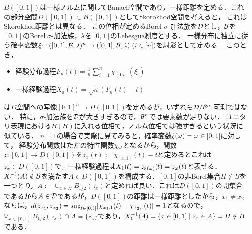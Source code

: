 \documentclass[uplatex,dvipdfmx]{jsreport}
\begin{document}
\begin{example}\label{exp-non-measurable-process}
    $B([0,1])$は一様ノルムに関してBanach空間であり，一様距離を定める．これの部分空間$D([0,1])\subset B([0,1])$としてSkorokhod空間を考えると，
    これはSkorokhod距離とは異なる．
    この位相が定めるBorel $\sigma$-加法族を$\mathcal{D}$とし，$\mathcal{B}$を$[0,1]$のBorel $\sigma$-加法族，$\lambda$を$[0,1]$のLebesgue測度とする．
    一様分布に独立に従う確率変数$\xi_i:([0,1],\mathcal{B},\lambda)^n\to([0,1],\mathcal{B},\lambda)\;(i\in[n])$を射影として定める．
    このとき，
    \begin{itemize}
        \item 経験分布過程$F_n(t)=\frac{1}{n}\sum_{i=1}^n\chi_{[0,t]}(\xi_i)$
        \item 一様経験過程$X_n(t)=\sqrt{n}(F_n(t)-t)$
    \end{itemize}
    は$D$空間への写像$[0,1]^n\to D([0,1])$を定めるが，いずれも$\mathcal{D}/\mathcal{B}^n$-可測ではない．
    特に，$\sigma$-加法族を$\mathcal{D}$が大きすぎるので，$\mathcal{B}^n$では要素数が足りない．
    ユニタリ表現における$B(H)$に入れる位相で，ノルム位相では強すぎるという状況に似ている．
    $n=1$の場合で実際に見てみると，確率変数$\xi(\omega)=\omega\in[0,1]$に対して，
    経験分布関数はただの特性関数$\chi_{\omega}$となるから，関数$z:[0,1]\to D([0,1])$を$z_x(t):=\chi_{[x,1]}(t)-t$と定めるとこれは$z_x\in D([0,1])$で，一様経験過程は$X_1(t)=z_{\xi(\omega)}(t)=z_\omega(t)$と表せる．
    $X_1^{-1}(A)\notin\mathcal{B}$を満たす$A\in D([0,1])$を構成する．$[0,1]$の非Borel集合$H\notin B$を一つとり，$A:=\cup_{x\in H}B_{1/2}(z_x)$と定めれば良い．これは$D([0,1])$の開集合であるから$A\in\mathcal{D}$であるが，$D([0,1])$の距離は一様距離としたから，$x_1\ne x_2$ならば，$d(z_{x_1},z_{x_2})=\sup_{t\in[0,1]}\lvert\chi_{x_1,1}(t)-\chi_{x_2,1}(t)\rvert=1$となるので，$\forall_{x\in[0,1]}\;B_{1/2}(z_x)\cap A=\{z_x\}$であり，$X_1^{-1}(A)=\left\{x\in[0,1]\mid z_x\in A\right\}=H\notin B$である．
\end{example}
\end{document}
